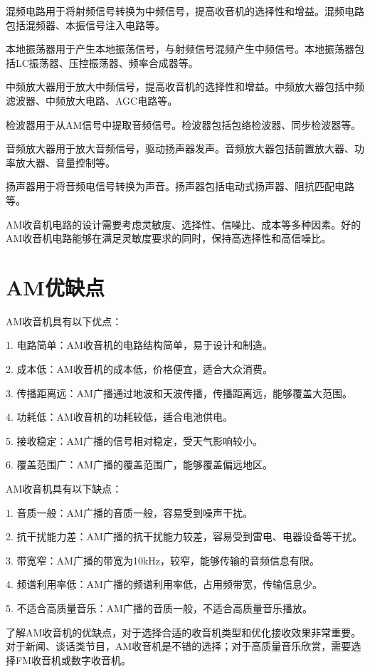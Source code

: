 \documentclass[12pt,UTF8]{ctexbook}
\begin{document}
混频电路用于将射频信号转换为中频信号，提高收音机的选择性和增益。混频电路包括混频器、本振信号注入电路等。

本地振荡器用于产生本地振荡信号，与射频信号混频产生中频信号。本地振荡器包括LC振荡器、压控振荡器、频率合成器等。

中频放大器用于放大中频信号，提高收音机的选择性和增益。中频放大器包括中频滤波器、中频放大电路、AGC电路等。

检波器用于从AM信号中提取音频信号。检波器包括包络检波器、同步检波器等。

音频放大器用于放大音频信号，驱动扬声器发声。音频放大器包括前置放大器、功率放大器、音量控制等。

扬声器用于将音频电信号转换为声音。扬声器包括电动式扬声器、阻抗匹配电路等。

AM收音机电路的设计需要考虑灵敏度、选择性、信噪比、成本等多种因素。好的AM收音机电路能够在满足灵敏度要求的同时，保持高选择性和高信噪比。

\section{AM优缺点}

AM收音机具有以下优点：

1. 电路简单：AM收音机的电路结构简单，易于设计和制造。

2. 成本低：AM收音机的成本低，价格便宜，适合大众消费。

3. 传播距离远：AM广播通过地波和天波传播，传播距离远，能够覆盖大范围。

4. 功耗低：AM收音机的功耗较低，适合电池供电。

5. 接收稳定：AM广播的信号相对稳定，受天气影响较小。

6. 覆盖范围广：AM广播的覆盖范围广，能够覆盖偏远地区。

AM收音机具有以下缺点：

1. 音质一般：AM广播的音质一般，容易受到噪声干扰。

2. 抗干扰能力差：AM广播的抗干扰能力较差，容易受到雷电、电器设备等干扰。

3. 带宽窄：AM广播的带宽为10kHz，较窄，能够传输的音频信息有限。

4. 频谱利用率低：AM广播的频谱利用率低，占用频带宽，传输信息少。

5. 不适合高质量音乐：AM广播的音质一般，不适合高质量音乐播放。

了解AM收音机的优缺点，对于选择合适的收音机类型和优化接收效果非常重要。对于新闻、谈话类节目，AM收音机是不错的选择；对于高质量音乐欣赏，需要选择FM收音机或数字收音机。
\end{document}
